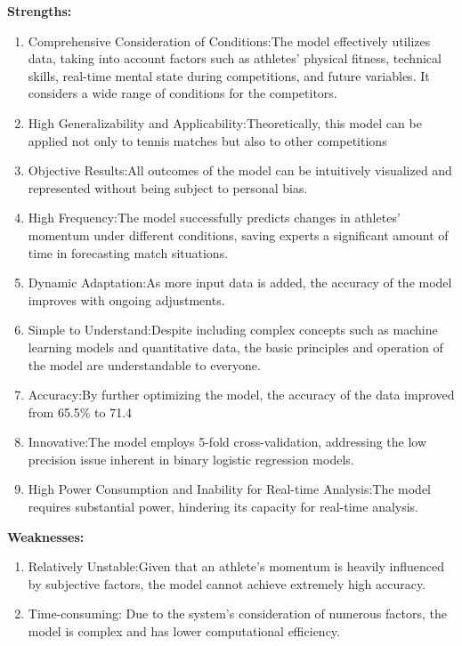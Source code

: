 \documentclass[12pt]{article}
\begin{document}
\textbf{Strengths:}
\begin{enumerate}
      \item Comprehensive Consideration of Conditions:The model effectively utilizes data, taking into account factors such as athletes' physical fitness, technical skills, real-time mental state during competitions, and future variables. It considers a wide range of conditions for the competitors.
      \item High Generalizability and Applicability:Theoretically, this model can be applied not only to tennis matches but also to other competitions
      \item Objective Results:All outcomes of the model can be intuitively visualized and represented without being subject to personal bias.
      \item High Frequency:The model successfully predicts changes in athletes' momentum under different conditions, saving experts a significant amount of time in forecasting match situations.
      \item Dynamic Adaptation:As more input data is added, the accuracy of the model improves with ongoing adjustments.
      \item Simple to Understand:Despite including complex concepts such as machine learning models and quantitative data, the basic principles and operation of the model are understandable to everyone.
      \item Accuracy:By further optimizing the model, the accuracy of the data improved from 65.5\% to 71.4%
      \item Innovative:The model employs 5-fold cross-validation, addressing the low precision issue inherent in binary logistic regression models.
      \item High Power Consumption and Inability for Real-time Analysis:The model requires substantial power, hindering its capacity for real-time analysis.
\end{enumerate}
\textbf{Weaknesses:}
\begin{enumerate}
      \item Relatively Unstable:Given that an athlete's momentum is heavily influenced by subjective factors, the model cannot achieve extremely high accuracy.
      \item Time-consuming: Due to the system's consideration of numerous factors, the model is complex and has lower computational efficiency.
\end{enumerate}
\end{document}
